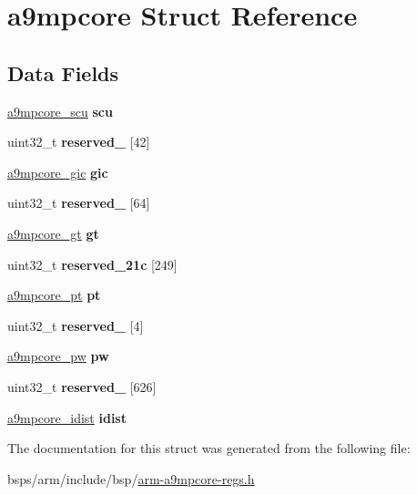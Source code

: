 \hypertarget{structa9mpcore}{}\section{a9mpcore Struct Reference}
\label{structa9mpcore}
\subsection*{Data Fields}
\begin{DoxyCompactItemize}
\item 
\mbox{\label{structa9mpcore_afc14f2a40c8055c2662a44692d195bf3}} 
\mbox{\hyperlink{structa9mpcore__scu}{a9mpcore\+\_\+scu}} {\bfseries scu}
\item 
\mbox{\label{structa9mpcore_af6f335ff93a84da195bd9ea2e10a5bec}} 
uint32\+\_\+t {\bfseries reserved\+\_} \mbox{[}42\mbox{]}
\item 
\mbox{\label{structa9mpcore_a7878f2e0b0997d05e59fd5e703eae102}} 
\mbox{\hyperlink{structa9mpcore__gic}{a9mpcore\+\_\+gic}} {\bfseries gic}
\item 
\mbox{\label{structa9mpcore_a79cab04dff5db72d5c82fc911abe1b5f}} 
uint32\+\_\+t {\bfseries reserved\+\_} \mbox{[}64\mbox{]}
\item 
\mbox{\label{structa9mpcore_a217f2994fc8adcd26640615e0d297db6}} 
\mbox{\hyperlink{structa9mpcore__gt}{a9mpcore\+\_\+gt}} {\bfseries gt}
\item 
\mbox{\label{structa9mpcore_ac0bd6b6ab84d98bd96f4f4db08647003}} 
uint32\+\_\+t {\bfseries reserved\+\_\+21c} \mbox{[}249\mbox{]}
\item 
\mbox{\label{structa9mpcore_aaae4c8ab77aa75237d4eac67c5864dce}} 
\mbox{\hyperlink{structa9mpcore__pt}{a9mpcore\+\_\+pt}} {\bfseries pt}
\item 
\mbox{\label{structa9mpcore_acc7a9039fdab6fa4ab2d29281ddc677f}} 
uint32\+\_\+t {\bfseries reserved\+\_} \mbox{[}4\mbox{]}
\item 
\mbox{\label{structa9mpcore_aa1bb66a2669e28d519fa486c0e8cf0a9}} 
\mbox{\hyperlink{structa9mpcore__pw}{a9mpcore\+\_\+pw}} {\bfseries pw}
\item 
\mbox{\label{structa9mpcore_acfa6320459c1a031bb658ecb32e7cfcc}} 
uint32\+\_\+t {\bfseries reserved\+\_} \mbox{[}626\mbox{]}
\item 
\mbox{\label{structa9mpcore_aaa3700a883f52992bf7f6ff28ff8ba62}} 
\mbox{\hyperlink{structa9mpcore__idist}{a9mpcore\+\_\+idist}} {\bfseries idist}
\end{DoxyCompactItemize}


The documentation for this struct was generated from the following file\+:\begin{DoxyCompactItemize}
\item 
bsps/arm/include/bsp/\mbox{\hyperlink{arm-a9mpcore-regs_8h}{arm-\/a9mpcore-\/regs.\+h}}\end{DoxyCompactItemize}
